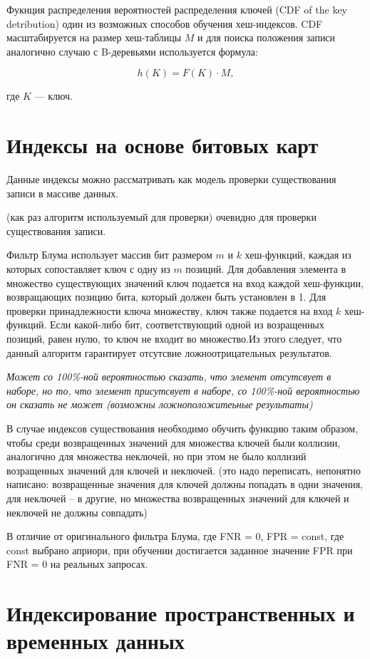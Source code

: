 Фукнция распределения вероятностей распределения ключей (CDF of the key
detribution) один из возможных способов обучения хеш-индексов. CDF
масштабируется на размер хеш-таблицы $M$ и для поиска положения записи
аналогично случаю с B-деревьями используется формула:

\begin{equation}
    h(K) = F(K) \cdot M,
\end{equation}

где $K$ --- ключ.

\section{Индексы на основе битовых карт}

Данные индексы можно рассматривать как модель проверки существования записи в
массиве данных.

 (как раз алгоритм используемый для проверки) очевидно
 для проверки существования записи.

Фильтр Блума использует массив бит размером $m$ и $k$ хеш-функций, каждая из
которых сопоставляет ключ с одну из $m$ позиций. Для добавления элемента в
множество существующих значений ключ подается на вход каждой хеш-функции,
возвращающих позицию бита, который должен быть установлен в 1. Для проверки
принадлежности ключа множеству, ключ также подается на вход $k$ хеш-функций.
Если какой-либо бит, соответствующий одной из возращенных позиций, равен нулю,
то ключ не входит во множество.Из этого следует, что данный алгоритм гарантирует
отсутсвие ложноотрицательных результатов.

\textit{Может со 100\%-ной вероятностью сказать, что элемент отсутсвует в
наборе, но то, что элемент присутсвует в наборе, со 100\%-ной вероятностью он
сказать не может (возможны ложноположитеьные результаты)}

В случае индексов существования необходимо обучить функцию таким образом, чтобы
среди возвращенных значений для множества ключей были коллизии, аналогично для
множества неключей, но при этом не было коллизий возращенных значений для ключей
и неключей. (это надо переписать, непонятно написано: возвращенные значения для
ключей должны попадать в одни значения, для неключей -- в другие, но множества
возвращенных значений для ключей и неключей не должны совпадать)

В отличие от оригинального фильтра Блума, где FNR = 0, FPR = const, где const
выбрано априори, при обучении достигается заданное значение FPR при FNR = 0 на
реальных запросах.



\section{Индексирование пространственных и временных данных}
